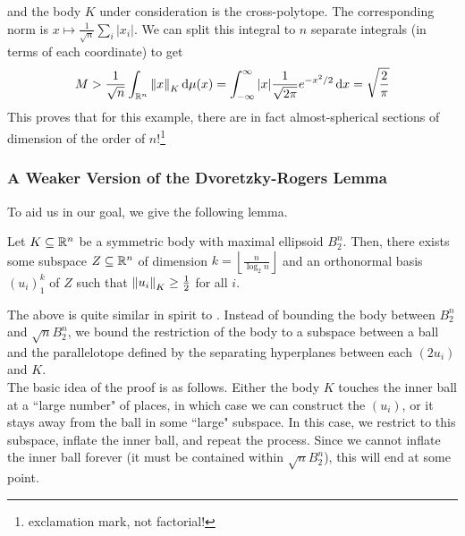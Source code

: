 and the body $K$ under consideration is the cross-polytope. The corresponding norm is $x\mapsto\frac{1}{\sqrt{n}}\sum_i |x_i|$. We can split this integral to $n$ separate integrals (in terms of each coordinate) to get
\[ M > \frac{1}{\sqrt{n}} \int_{\mathbb{R}^n} \left\lVert x\right\rVert_K \operatorname{d}\!{\mu}(x) = \int_{-\infty}^{\infty} |x| \frac{1}{\sqrt{2\pi}} e^{-x^2/2} \operatorname{d}\!{x}  = \sqrt\frac{2}{\pi} \]
This proves that for this example, there are in fact almost-spherical sections of dimension of the order of $n$!\footnote{exclamation mark, not factorial!}

\subsubsection{A Weaker Version of the Dvoretzky-Rogers Lemma}
\label{3.2.3 Dvoretzky Rogers Lemma}

To aid us in our goal, we give the following lemma.

\begin{ftheo}
\label{dvoretzky rogers lemma}
Let $K\subseteq\mathbb{R}^n$ be a symmetric body with maximal ellipsoid $B_2^n$. Then, there exists some subspace $Z\subseteq\mathbb{R}^n$ of dimension $k=\left\lfloor\frac{n}{\log_2 n}\right\rfloor$ and an orthonormal basis $(u_i)_1^k$ of $Z$ such that $\left\lVert u_i\right\rVert_{K}\geq \frac{1}{2}$ for all $i$.
\end{ftheo}

The above is quite similar in spirit to . Instead of bounding the body between $B_2^n$ and $\sqrt{n}B_2^n$, we bound the restriction of the body to a subspace between a ball and the parallelotope defined by the separating hyperplanes between each $(2u_i)$ and $K$.\\

The basic idea of the proof is as follows. Either the body $K$ touches the inner ball at a ``large number" of places, in which case we can construct the $(u_i)$, or it stays away from the ball in some ``large" subspace. In this case, we restrict to this subspace, inflate the inner ball, and repeat the process. Since we cannot inflate the inner ball forever (it must be contained within $\sqrt{n}B_2^n$), this will end at some point.

